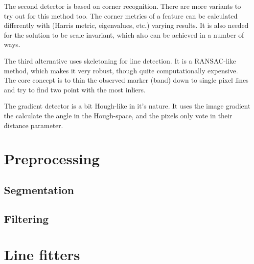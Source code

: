 The second detector is based on corner recognition.
There are more variants to try out for this method too.
The corner metrics of a feature can be calculated differently with (Harris metric, eigenvalues, etc.) varying results.
It is also needed for the solution to be scale invariant, which also can be achieved in a number of ways.

The third alternative uses skeletoning for line detection.
It is a RANSAC-like method, which makes it very robust, though quite computationally expensive.
The core concept is to thin the observed marker (band) down to single pixel lines and try to find two point with the most inliers.

The gradient detector is a bit Hough-like in it's nature.
It uses the image gradient the calculate the angle in the Hough-space, and the pixels only vote in their distance parameter.

\section{Preprocessing}



\subsection{Segmentation}



\subsection{Filtering}



\section{Line fitters}



